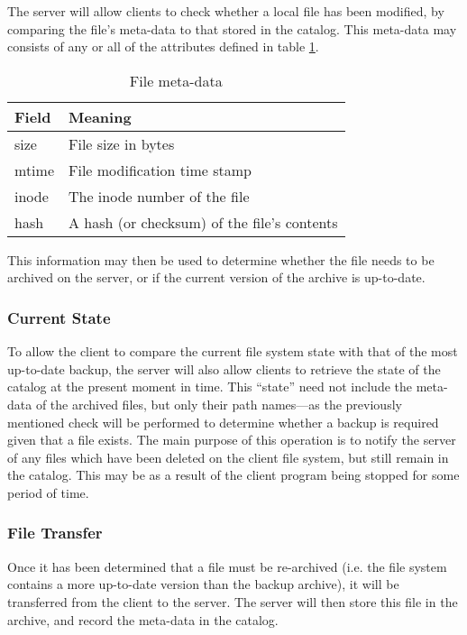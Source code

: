 The server will allow clients to check whether a local file has been modified,
by comparing the file's meta-data to that stored in the catalog. This meta-data
may consists of any or all of the attributes defined in table
\ref{tab:meta-data}.

\begin{table}[h]
    \centering
    \begin{tabular}{| l | l |} \hline
        Field       & Meaning                                       \\ \hline
        size        & File size in bytes                            \\ \hline
        mtime       & File modification time stamp                  \\ \hline
        inode       & The inode number of the file                  \\ \hline
        hash        & A hash (or checksum) of the file's contents   \\ \hline
    \end{tabular}
    \caption{File meta-data}
    \label{tab:meta-data}
\end{table}

This information may then be used to determine whether the file needs to be
archived on the server, or if the current version of the archive is up-to-date.

\subsubsection{Current State}

To allow the client to compare the current file system state with that of the
most up-to-date backup, the server will also allow clients to retrieve the
state of the catalog at the present moment in time. This ``state'' need not
include the meta-data of the archived files, but only their path names---as the
previously mentioned check will be performed to determine whether a backup is
required given that a file exists. The main purpose of this operation is to
notify the server of any files which have been deleted on the client file
system, but still remain in the catalog. This may be as a result of the client
program being stopped for some period of time.

\subsubsection{File Transfer}

Once it has been determined that a file must be re-archived (i.e. the file
system contains a more up-to-date version than the backup archive), it will be
transferred from the client to the server. The server will then store this file
in the archive, and record the meta-data in the catalog.


